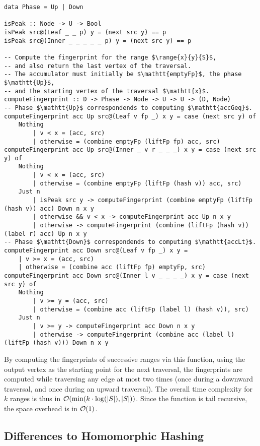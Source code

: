 \begin{verbatim}
data Phase = Up | Down

isPeak :: Node -> U -> Bool
isPeak src@(Leaf _ _ p) y = (next src y) == p
isPeak src@(Inner _ _ _ _ _ p) y = (next src y) == p

-- Compute the fingerprint for the range $\range{x}{y}{S}$,
-- and also return the last vertex of the traversal.
-- The accumulator must initially be $\mathtt{emptyFp}$, the phase $\mathtt{Up}$,
-- and the starting vertex of the traversal $\mathtt{x}$.
computeFingerprint :: D -> Phase -> Node -> U -> U -> (D, Node)
-- Phase $\mathtt{Up}$ correspondends to computing $\mathtt{accGeq}$.
computeFingerprint acc Up src@(Leaf v fp _) x y = case (next src y) of
    Nothing
        | v < x = (acc, src)
        | otherwise = (combine emptyFp (liftFp fp) acc, src)
computeFingerprint acc Up src@(Inner _ v r _ _ _) x y = case (next src y) of
    Nothing
        | v < x = (acc, src)
        | otherwise = (combine emptyFp (liftFp (hash v)) acc, src)
    Just n
        | isPeak src y -> computeFingerprint (combine emptyFp (liftFp (hash v)) acc) Down n x y
        | otherwise && v < x -> computeFingerprint acc Up n x y
        | otherwise -> computeFingerprint (combine (liftFp (hash v)) (label r) acc) Up n x y
-- Phase $\mathtt{Down}$ correspondends to computing $\mathtt{accLt}$.
computeFingerprint acc Down src@(Leaf v fp _) x y =
    | v >= x = (acc, src)
    | otherwise = (combine acc (liftFp fp) emptyFp, src)
computeFingerprint acc Down src@(Inner l v _ _ _ _) x y = case (next src y) of
    Nothing
        | v >= y = (acc, src)
        | otherwise = (combine acc (liftFp (label l) (hash v)), src)
    Just n
        | v >= y -> computeFingerprint acc Down n x y
        | otherwise -> computeFingerprint (combine acc (label l) (liftFp (hash v))) Down n x y
\end{verbatim}

By computing the fingerprints of successive ranges via this function, using the output vertex as the starting point for the next traversal, the fingerprints are computed while traversing any edge at most two times (once during a downward traversal, and once during an upward traversal). The overall time complexity for $k$ ranges is thus in $\mathcal{O}(\min(k \cdot \log(|{S}|), |{S}|))$. Since the function is tail recursive, the space overhead is in $\mathcal{O}(1)$.

\subsection{Differences to Homomorphic Hashing}


